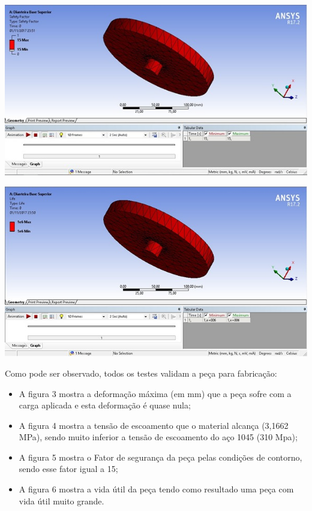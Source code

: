 
     \begin{center}
    	\includegraphics[scale=0.7]{figuras/fator_seguranca_1}
        \label{fator_seguranca_1}
    \end{center}
    

     \begin{center}
    	\includegraphics[scale=0.7]{figuras/vida_util_1}
        \label{vida_util_1}
    \end{center}


    Como pode ser observado, todos os testes validam a peça para fabricação:

    \begin{itemize}
        \item A figura 3 mostra a deformação máxima (em mm) que a peça sofre com a carga aplicada e esta deformação é quase nula;
        \item A figura 4 mostra a tensão de escoamento que o material alcança (3,1662 MPa), sendo muito inferior a tensão de escoamento do aço 1045 (310 Mpa);
        \item A figura 5 mostra o Fator de segurança da peça pelas condições de contorno, sendo esse fator igual a 15;
        \item A figura 6 mostra a vida útil da peça tendo como resultado uma peça com vida útil muito grande.
    \end{itemize}
  
